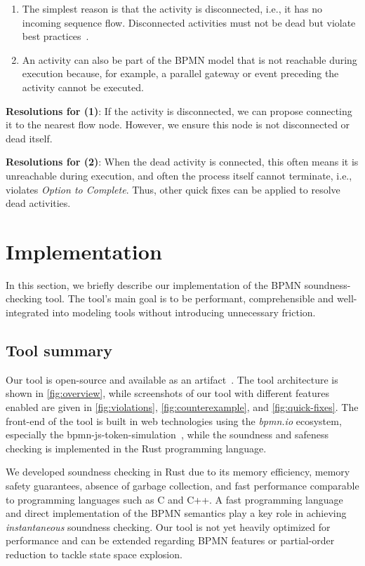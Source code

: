 \documentclass[runningheads]{llncs}
\begin{document}
\begin{enumerate}
	\item The simplest reason is that the activity is disconnected, i.e., it has no incoming sequence flow.
	Disconnected activities must not be dead but violate best practices~\cite{camundaservicesgmbhBpmnlint2024}.
	\item An activity can also be part of the BPMN model that is not reachable during execution because, for example, a parallel gateway or event preceding the activity cannot be executed.
\end{enumerate}

\textbf{Resolutions for (1)}: If the activity is disconnected, we can propose connecting it to the nearest flow node.
However, we ensure this node is not disconnected or dead itself.

\textbf{Resolutions for (2)}: When the dead activity is connected, this often means it is unreachable during execution, and often the process itself cannot terminate, i.e., violates \textit{Option to Complete}.
Thus, other quick fixes can be applied to resolve dead activities.

\section{Implementation} \label{sec:impl}

In this section, we briefly describe our implementation of the BPMN soundness-checking tool.
The tool's main goal is to be performant, comprehensible and well-integrated into modeling tools without introducing unnecessary friction.

\subsection{Tool summary}
Our tool is open-source and available as an artifact~\cite{noauthorgivenBPM2024Artifacts2024}.
The tool architecture is shown in \autoref{fig:overview}, while screenshots of our tool with different features enabled are given in \autoref{fig:violations}, \autoref{fig:counterexample}, and \autoref{fig:quick-fixes}.
The front-end of the tool is built in web technologies using the \textit{bpmn.io} ecosystem, especially the bpmn-js-token-simulation~\cite{camundaservicesgmbhBpmnjsTokenSimulation2024}, while the soundness and safeness checking is implemented in the Rust programming language.

We developed soundness checking in Rust due to its memory efficiency, memory safety guarantees, absence of garbage collection, and fast performance comparable to programming languages such as C and C++.
A fast programming language and direct implementation of the BPMN semantics play a key role in achieving \textit{instantaneous} soundness checking.
Our tool is not yet heavily optimized for performance and can be extended regarding BPMN features or partial-order reduction to tackle state space explosion.
\end{document}
